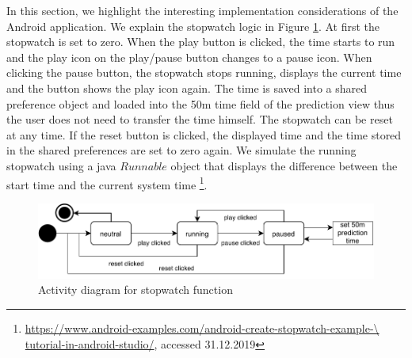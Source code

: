In this section, we highlight the interesting implementation considerations of the Android application. We explain the stopwatch logic in Figure \ref{fig:stopwatch_logic}. At first the stopwatch is set to zero. When the play button is clicked, the time starts to run and the play icon on the play/pause button changes to a pause icon. When clicking the pause button, the stopwatch stops running, displays the current time and the button shows the play icon again. The time is saved into a shared preference object and loaded into the 50m time field of the prediction view thus the user does not need to transfer the time himself. The stopwatch can be reset at any time. If the reset button is clicked, the displayed time and the time stored in the shared preferences are set to zero again. We simulate the running stopwatch using a java $Runnable$ object that displays the difference between the start time and the current system time \footnote{\url{https://www.android-examples.com/android-create-stopwatch-example-\ tutorial-in-android-studio/}, accessed 31.12.2019}.\\
\begin{figure}[ht]
    \centering
    \includegraphics[scale=0.5]{visualisation/StopwatchLogic.pdf}
    \caption{Activity diagram for stopwatch function}
    \label{fig:stopwatch_logic}
\end{figure}
